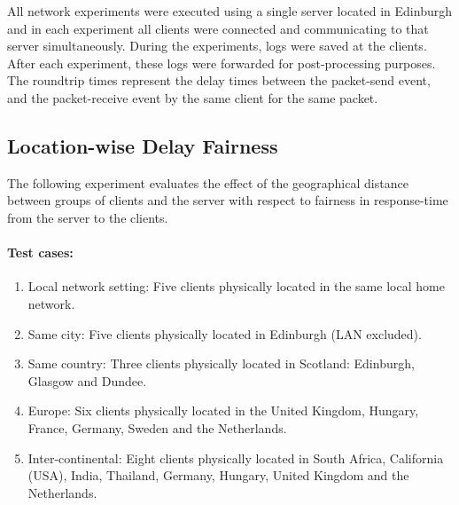 \documentclass[bsc,frontabs,twoside,singlespacing,parskip,deptreport]{infthesis}     %
\begin{document}
All network experiments were executed using a single server located in Edinburgh and in each experiment all clients were connected and communicating to that server simultaneously. During the experiments, logs were saved at the clients. After each experiment, these logs were forwarded for post-processing purposes. The roundtrip times represent the delay times between the packet-send event, and the packet-receive event by the same client for the same packet.

\subsection{Location-wise Delay Fairness}
The following experiment evaluates the effect of the geographical distance between groups of clients and the server with respect to fairness in response-time from the server to the clients.

\paragraph*{Test cases:}
\begin{enumerate}
\item Local network setting: Five clients physically located in the same local home network.

\item Same city: Five clients physically located in Edinburgh (LAN excluded).

\item Same country: Three clients physically located in Scotland: Edinburgh, Glasgow and Dundee.

\item Europe: Six clients physically located in the United Kingdom, Hungary, France, Germany, Sweden and the Netherlands.

\item Inter-continental: Eight clients physically located in South Africa, California (USA), India, Thailand, Germany, Hungary, United Kingdom and the Netherlands.

\end{enumerate}
\end{document}
